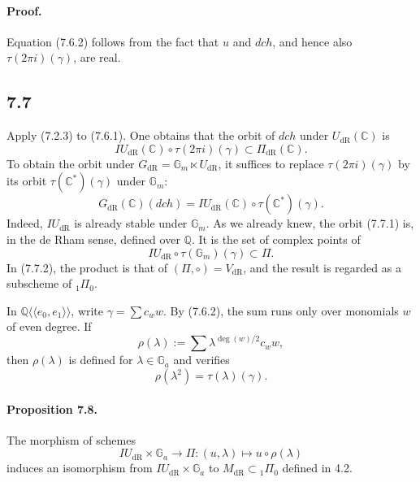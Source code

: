 \documentclass[11pt]{article}
\newcommand{\Q}{\mathbb Q}
\newcommand{\C}{\mathbb C}
\newcommand{\Gm}{\mathbb G_m}
\newcommand{\Ga}{\mathbb G_a}
\newcommand{\dR}{\mathrm{dR}}
\begin{document}
\paragraph{Proof.}
Equation (7.6.2) follows from the fact that $u$ and $dch$, and hence also $\tau(2\pi i)(\gamma)$, are real.

\subsection*{7.7}
Apply (7.2.3) to (7.6.1).
One obtains that the orbit of $dch$ under $U_{\dR}(\C)$ is
\[
 IU_{\dR}(\C)\circ\tau(2\pi i)(\gamma)\subset \Pi_{\dR}(\C).
\]
To obtain the orbit under $G_{\dR}=\Gm\ltimes U_{\dR}$, it suffices to replace $\tau(2\pi i)(\gamma)$ by its orbit $\tau(\C^*)(\gamma)$ under $\Gm$:
\begin{equation}
 G_{\dR}(\C)(dch)=IU_{\dR}(\C)\circ\tau(\C^*)(\gamma).
\tag{7.7.1}
\end{equation}
Indeed, $IU_{\dR}$ is already stable under $\Gm$.
As we already knew, the orbit (7.7.1) is, in the de Rham sense, defined over $\Q$.
It is the set of complex points of
\begin{equation}
 IU_{\dR}\circ\tau(\Gm)(\gamma)\subset\Pi.
\tag{7.7.2}
\end{equation}
In (7.7.2), the product is that of $(\Pi,\circ)=V_{\dR}$, and the result is regarded as a subscheme of ${}_1\Pi_0$.

In $\Q\langle\!\langle e_0,e_1\rangle\!\rangle$, write $\gamma=\sum c_w w$.
By (7.6.2), the sum runs only over monomials $w$ of even degree.
If
\[
 \rho(\lambda):=\sum \lambda^{\deg(w)/2}c_w w,
\]
then $\rho(\lambda)$ is defined for $\lambda\in\Ga$ and verifies
\begin{equation}
 \rho(\lambda^2)=\tau(\lambda)(\gamma).
\tag{7.7.3}
\end{equation}

\paragraph{Proposition 7.8.}
The morphism of schemes
\begin{equation}
 IU_{\dR}\times\Ga\longrightarrow\Pi:(u,\lambda)\longmapsto u\circ\rho(\lambda)
\tag{7.8.1}
\end{equation}
induces an isomorphism from $IU_{\dR}\times\Ga$ to $M_{\dR}\subset{}_1\Pi_0$ defined in 4.2.
\end{document}
